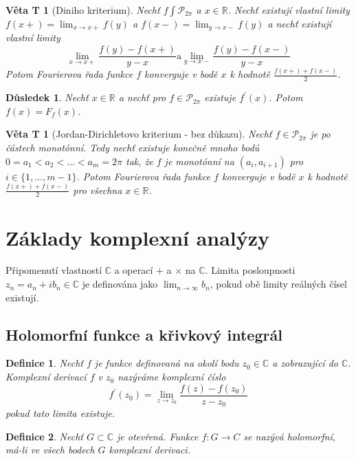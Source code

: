 \documentclass[11pt,a4paper]{article}
\newcounter{vety}
\newtheorem*{definice}{Definice}
\newtheorem{vetat}[vety]{Věta T}
\newtheorem*{dusledek}{Důsledek}
\begin{document}
\begin{vetat}[Diniho kriterium]
Nechť $f \int \mathcal{P}_{2 \pi}$ a $x \in \mathbb{R}$. Nechť existují vlastní limity $f(x+) = \lim_{x \rightarrow x+} f(y)$ a $f(x-) = \lim_{y \rightarrow x-} f(y)$ a nechť existují vlastní limity
$$\lim_{x \rightarrow x+} \frac{f(y)-f(x+)}{y-x} \mathrm{a} \lim_{y \rightarrow x-} \frac{f(y)-f(x-)}{y-x}$$
Potom Fourierova řada funkce $f$ konverguje v bodě $x$ k hodnotě $\frac{f(x+) + f(x-)}{2}$.
\end{vetat}

\begin{dusledek}
Nechť $x \in \mathbb{R}$ a nechť pro $f \in \mathcal{P}_{2 \pi}$ existuje $f^\prime (x)$. Potom $f(x)=F_f(x)$.
\end{dusledek}

\begin{vetat}[Jordan-Dirichletovo kriterium - bez důkazu]
Nechť $f \in \mathcal{P}_{2\pi}$ je po částech monotónní. Tedy nechť existuje konečně mnoho bodů $0=a_1 < a_2 < \ldots < a_m = 2 \pi$ tak, že $f$ je monotónní na $(a_i, a_{i+1})$ pro $i \in \{1, \ldots, m-1 \}$. Potom Fourierova řada funkce $f$ konverguje v bodě $x$ k hodnotě $\frac{f(x+) + f(x-)}{2}$ pro všechna $x \in \mathbb{R}$.
\end{vetat}

\pagebreak
\setcounter{vety}{0}
\section{Základy komplexní analýzy}

Připomenutí vlastností $\mathbb{C}$ a operací $+$ a $\times$ na $\mathbb{C}$. Limita posloupnosti $z_n = a_n + i b_n \in \mathbb{C}$ je definována jako $\lim_{n \rightarrow \infty} b_n$, pokud obě limity reálných čísel existují.

\subsection{Holomorfní funkce a křivkový integrál}

\begin{definice}
Nechť $f$ je funkce definovaná na okolí bodu $z_0 \in \mathbb{C}$ a zobrazující do $\mathbb{C}$. Komplexní derivací $f$ v $z_0$ nazýváme komplexní číslo
$$f^\prime (z_0) = \lim_{z \rightarrow z_0} \frac{f(z) - f(z_0)}{z - z_0}$$
pokud tato limita existuje.
\end{definice}

\begin{definice}
Nechť $G \subset \mathbb{C}$ je otevřená. Funkce $f : G \rightarrow C$ se nazývá \emph{holomorfní}, má-li ve všech bodech $G$ komplexní derivaci.
\end{definice}
\end{document}
